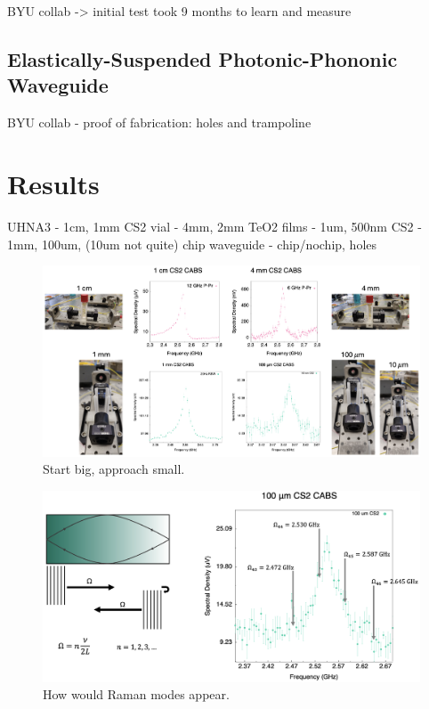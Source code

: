 BYU collab -> initial test took 9 months to learn and measure

\subsection{Elastically-Suspended Photonic-Phononic Waveguide}
\label{subsec:Raman:Target:WigglyWaveguide}

BYU collab - proof of fabrication: holes and trampoline


\section{Results}
\label{sec:Raman:Results}

UHNA3 - 1cm, 1mm
CS2 vial - 4mm, 2mm
TeO2 films - 1um, 500nm
CS2 - 1mm, 100um, (10um not quite)
chip waveguide - chip/nochip, holes

\begin{figure}[t]
  \centering
  \includegraphics[width=\textwidth]{figs/4-Raman/StartBigApproachSmall.png}
  \caption{Start big, approach small.}
  \label{fig:StartBigApproachSmall}
\end{figure}

\begin{figure}[t]
  \centering
  \includegraphics[width=\textwidth]{figs/4-Raman/HowWouldRamanModesAppear.png}
  \caption{How would Raman modes appear.}
  \label{fig:HowWouldRamanModesAppear}
\end{figure}

